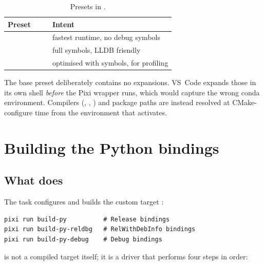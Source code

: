 \begin{table}[H]
  \centering
  \caption{Presets in .}
  \label{tab:dev-presets}
  \small
  \begin{tabularx}{\textwidth}{@{}l l W{0.95} W{1.05}@{}}
    \toprule
    Preset &  &  & Intent \\
    \midrule
            &         &         & fastest runtime, no debug symbols \\
              &           &   & full symbols, LLDB friendly \\
     &  &  & optimised with symbols, for profiling \\
    \bottomrule
  \end{tabularx}
\end{table}

\begin{lupntnote}
The base preset deliberately contains no  expansions.
VS~Code expands those in its own shell \emph{before} the Pixi wrapper runs,
which would capture the wrong conda environment. Compilers (,
, ) and package paths are instead resolved at
CMake-configure time from the environment that  activates.
\end{lupntnote}

\section{Building the Python bindings}
\label{sec:dev-bindings}

\subsection{What  does}

The task  configures  and builds the
custom target :

\begin{lstlisting}[language=shell]
pixi run build-py          # Release bindings
pixi run build-py-reldbg   # RelWithDebInfo bindings
pixi run build-py-debug    # Debug bindings
\end{lstlisting}

 is not a compiled target itself; it is a driver that
performs four steps in order:


